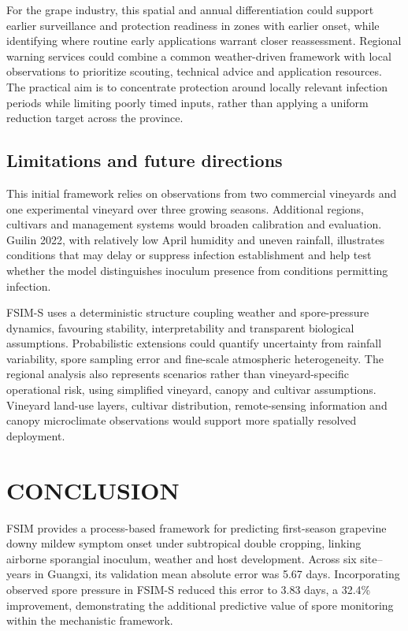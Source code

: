 \documentclass{article}
\begin{document}
For the grape industry, this spatial and annual differentiation could
support earlier surveillance and protection readiness in zones with earlier
onset, while identifying where routine early applications warrant closer
reassessment. Regional warning services could combine a common
weather-driven framework with local observations to prioritize scouting,
technical advice and application resources. The practical aim is to
concentrate protection around locally relevant infection periods while
limiting poorly timed inputs, rather than applying a uniform reduction
target across the province.

\subsection{Limitations and future
directions}\label{limitations-and-future-directions}

This initial framework relies on observations from two commercial
vineyards and one experimental vineyard over three growing seasons.
Additional regions, cultivars and management systems would broaden
calibration and evaluation. Guilin 2022, with relatively low April
humidity and uneven rainfall, illustrates conditions that may delay or
suppress infection establishment and help test whether the model
distinguishes inoculum presence from conditions permitting infection.

FSIM-S uses a deterministic structure coupling weather and spore-pressure
dynamics, favouring stability, interpretability and transparent
biological assumptions. Probabilistic extensions could quantify
uncertainty from rainfall variability, spore sampling error and
fine-scale atmospheric heterogeneity. The regional analysis also
represents scenarios rather than vineyard-specific operational risk,
using simplified vineyard, canopy and cultivar assumptions. Vineyard
land-use layers, cultivar distribution, remote-sensing information and
canopy microclimate observations would support more spatially resolved
deployment.

\section{CONCLUSION}\label{conclusion}

FSIM provides a process-based framework for predicting first-season
grapevine downy mildew symptom onset under subtropical double cropping,
linking airborne sporangial inoculum, weather and host development.
Across six site--years in Guangxi, its validation mean absolute error was
5.67 days. Incorporating observed spore pressure in FSIM-S reduced this
error to 3.83 days, a 32.4\% improvement, demonstrating the additional
predictive value of spore monitoring within the mechanistic framework.
\end{document}
